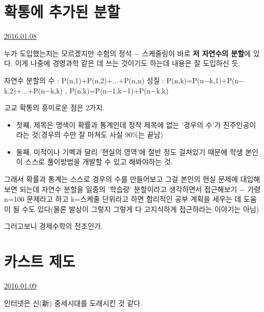 \section{확통에 추가된 분할}
\href{https://www.kockoc.com/Apoc/580053}{2016.01.08}

\vspace{5mm}

누가 도입했는지는 모르겠지만
수험의 정석 $-$ 스케줄링이 바로 \textbf{저 자연수의 분할}에 있다.
이게 나중에 경영과학 같은 데 쓰는 것이기도 하는데 내용은 잘 도입하신 듯.
\vspace{5mm}

자연수 분할의 수 : P(n,1)+P(n,2)+...+P(n,n)
성질 : P(n,k)=P(n$-$k,1)+P(n$-$k,2)+...+P(n$-$k,k) , P(n,k)=P(n$-$1,k$-$1)+P(n$-$k,k)
\vspace{5mm}

고교 확통의 흥미로운 점은 2가지.
\vspace{5mm}

\begin{itemize}
    \item 첫째, 제목은 명색이 확률과 통계인데 정작 제목에 없는 '경우의 수'가 진주인공이라는 것(경우의 수만 잘 마쳐도 사실 90$\%$는 끝남)
    \item 둘째, 미적이나 기벡과 달리 '현실의 영역'에 절반 정도 걸쳐있기 때문에 학생 본인이 스스로 풀이방법을 개발할 수 있고 해봐야하는 것.
\end{itemize}
그래서 확률과 통계는 스스로 경우의 수를 만들어보고 그걸 본인의 현실 문제에 대입해보면 되는데
자연수 분할을 일종의 '학습량' 분할이라고 생각하면서 접근해보기 $-$ 가령 n=100 문제라고 하고 k=스케줄 단위라고 하면
합리적인 공부 계획을 세우는 데 도움이 될 수도 있다(물론 발상이 그렇지 그렇게 다 고지식하게 접근하라는 이야기는 아님)
\vspace{5mm}

그러고보니 경제수학의 전조인가.
\vspace{5mm}











\section{카스트 제도}
\href{https://www.kockoc.com/Apoc/581753}{2016.01.09}

\vspace{5mm}

인터넷은 신(新) 중세시대를 도래시킨 것 같다.
\vspace{5mm}

